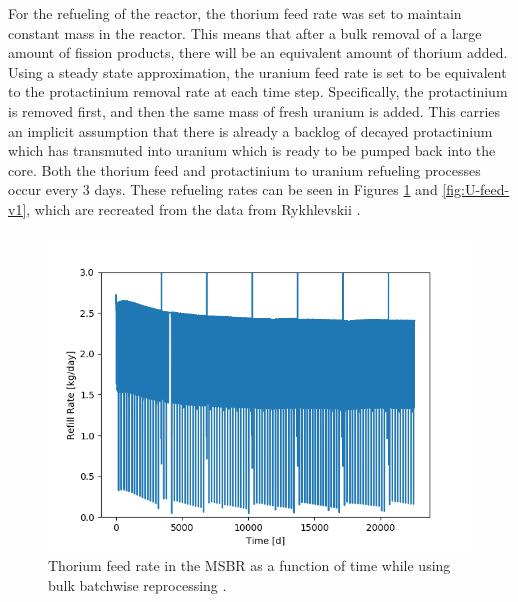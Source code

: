 For the refueling of the reactor, the thorium feed rate was set to maintain constant mass in the reactor. This means that after a bulk removal of a large amount of fission products, there will be an equivalent amount of thorium added. Using a steady state approximation, the uranium feed rate is set to be equivalent to the protactinium removal rate at each time step. Specifically, the protactinium is removed first, and then the same mass of fresh uranium is added. This carries an implicit assumption that there is already a backlog of decayed protactinium which has transmuted into uranium which is ready to be pumped back into the core. Both the thorium feed and protactinium to uranium refueling processes occur every 3 days. These refueling rates can be seen in Figures \ref{fig:Th-feed-v1} and \ref{fig:U-feed-v1}, which are recreated from the data from Rykhlevskii \cite{rykhlevskii_advanced_2018}.


\begin{figure}[H]
  \centering
  \includegraphics[scale=0.75]{images/Th232rem_massv01.png}
  \caption{Thorium feed rate in the MSBR as a function of time while using bulk batchwise reprocessing \cite{rykhlevskii_advanced_2018}.}
   \label{fig:Th-feed-v1}
\end{figure}

